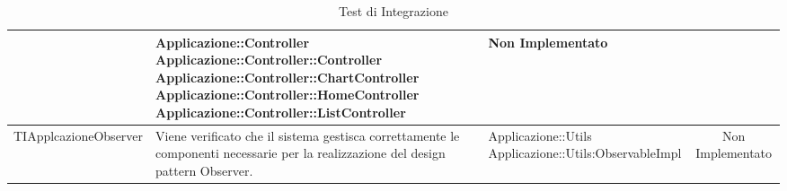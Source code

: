 \begin{table}[H]
\begin{center}
\begin{longtabu}{| X | X | X | c |}
			& \parbox[t]{0.4\textwidth}{
			Applicazione::Controller\\
			Applicazione::Controller::Controller\\
			Applicazione::Controller::ChartController\\
			Applicazione::Controller::HomeController\\
			Applicazione::Controller::ListController}
			& Non Implementato
\\ \hline
			TIApplcazioneObserver &
			Viene verificato che il sistema gestisca correttamente le componenti necessarie per la realizzazione del design pattern Observer.
			& \parbox[t]{0.4\textwidth}{
			Applicazione::Utils\\
			Applicazione::Utils:ObservableImpl}
			& Non Implementato 
\\ \hline
		\end{longtabu}
	\end{center}
	\caption{Test di Integrazione}
\end{table}